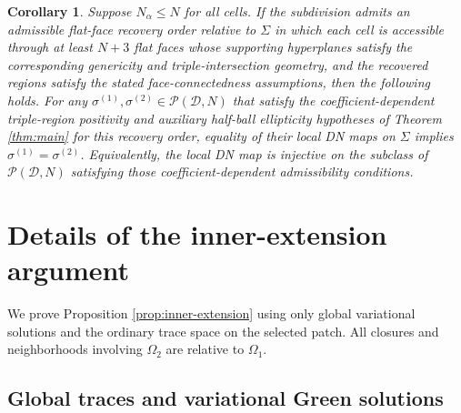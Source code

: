 \documentclass[10pt,a4paper]{amsart}
\newtheorem{corollary}[theorem]{Corollary}
\begin{document}
\begin{corollary}
\label{cor:uniform-degree}
Suppose \(N_\alpha\le N\) for all cells.  If the subdivision admits an
admissible flat-face recovery order relative to \(\Sigma\) in which each cell is
accessible through at least \(N+3\) flat faces whose supporting hyperplanes
satisfy the corresponding genericity and triple-intersection geometry, and the
recovered regions satisfy the stated face-connectedness assumptions, then the
following holds.  For any
\(\sigma^{(1)},\sigma^{(2)}\in\mathcal P(\mathcal D,N)\) that satisfy the
coefficient-dependent triple-region positivity and auxiliary half-ball
ellipticity hypotheses of Theorem \ref{thm:main} for this recovery order,
equality of their local DN maps on \(\Sigma\) implies
\(\sigma^{(1)}=\sigma^{(2)}\).  Equivalently, the local DN map is injective on
the subclass of \(\mathcal P(\mathcal D,N)\) satisfying those
coefficient-dependent admissibility conditions.
\end{corollary}


\appendix

\section{Details of the inner-extension argument}
\label{app:inner-extension-proof}

We prove Proposition \ref{prop:inner-extension} using only global variational
solutions and the ordinary trace space on the selected patch.  All closures and
neighborhoods involving \(\Omega_2\) are relative to \(\Omega_1\).

\subsection{Global traces and variational Green solutions}
\end{document}

